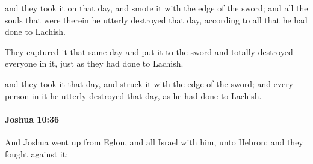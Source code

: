 			\begin{versebox}
					\item[BHS] 
					\item[ASV] and they took it on that day, and smote it with the edge of the sword; and all the souls that were therein he utterly destroyed that day, according to all that he had done to Lachish.
					\item[NIV] They captured it that same day and put it to the sword and totally destroyed everyone in it, just as they had done to Lachish.
					\item[NRSV] and they took it that day, and struck it with the edge of the sword; and every person in it he utterly destroyed that day, as he had done to Lachish.
			\end{versebox}

		\paragraph{Joshua 10:36} %
			\label{JOSHUA-10-36}

			And Joshua went up from Eglon, and all Israel with him, unto Hebron; and they fought against it:

